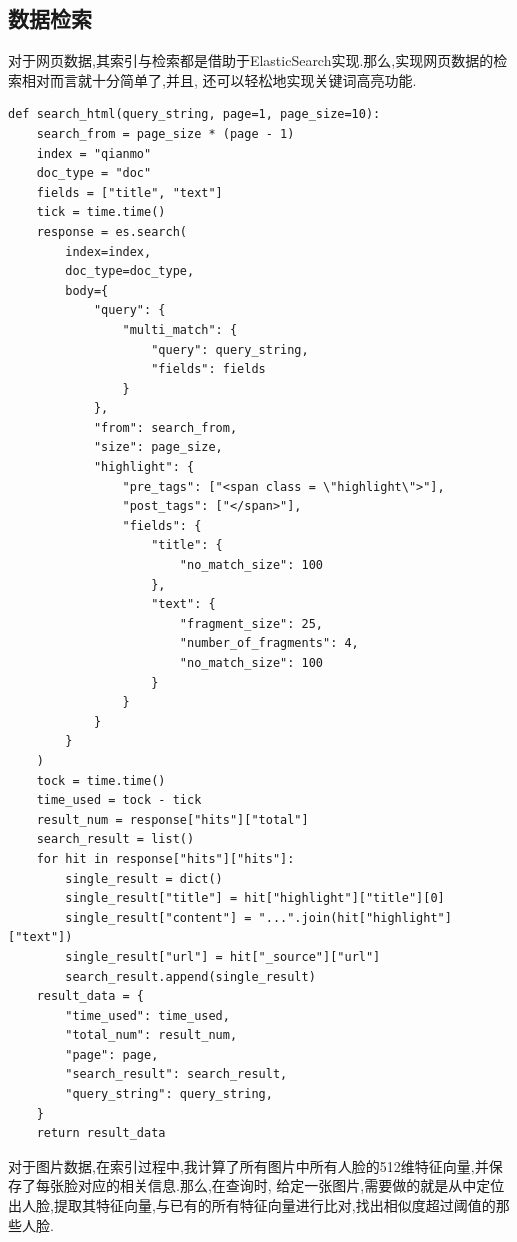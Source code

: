\documentclass[a4paper]{article}
\begin{document}
        \subsection{数据检索}
对于网页数据,其索引与检索都是借助于ElasticSearch实现.那么,实现网页数据的检索相对而言就十分简单了,并且,
还可以轻松地实现关键词高亮功能.
\begin{verbatim}
def search_html(query_string, page=1, page_size=10):
    search_from = page_size * (page - 1)
    index = "qianmo"
    doc_type = "doc"
    fields = ["title", "text"]
    tick = time.time()
    response = es.search(
        index=index,
        doc_type=doc_type,
        body={
            "query": {
                "multi_match": {
                    "query": query_string,
                    "fields": fields
                }
            },
            "from": search_from,
            "size": page_size,
            "highlight": {
                "pre_tags": ["<span class = \"highlight\">"],
                "post_tags": ["</span>"],
                "fields": {
                    "title": {
                        "no_match_size": 100  
                    },
                    "text": {
                        "fragment_size": 25,
                        "number_of_fragments": 4,
                        "no_match_size": 100
                    }
                }
            }
        }
    )
    tock = time.time()
    time_used = tock - tick
    result_num = response["hits"]["total"]
    search_result = list()
    for hit in response["hits"]["hits"]:
        single_result = dict()
        single_result["title"] = hit["highlight"]["title"][0]
        single_result["content"] = "...".join(hit["highlight"]["text"])
        single_result["url"] = hit["_source"]["url"]
        search_result.append(single_result)
    result_data = {
        "time_used": time_used,
        "total_num": result_num,
        "page": page,
        "search_result": search_result,
        "query_string": query_string,
    }
    return result_data
\end{verbatim}

\label{face_index}
对于图片数据,在索引过程中,我计算了所有图片中所有人脸的512维特征向量,并保存了每张脸对应的相关信息.那么,在查询时,
给定一张图片,需要做的就是从中定位出人脸,提取其特征向量,与已有的所有特征向量进行比对,找出相似度超过阈值的那些人脸.
\end{document}
